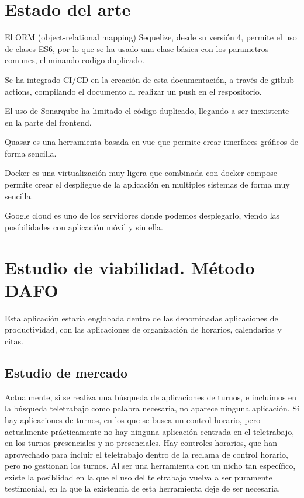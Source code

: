 \documentclass[11pt,spanish,listoffigures,listoftables]{tfgetsinf}
\begin{document}


\chapter{Estado del arte}

El ORM (object-relational mapping) Sequelize, desde su versión 4, permite el uso de clases ES6, por lo que se ha usado una clase básica con los parametros comunes, eliminando codigo duplicado.

Se ha integrado CI/CD en la creación de esta documentación, a través de github actions, compilando el documento al realizar un push en el respositorio.

El uso de Sonarqube ha limitado el código duplicado, llegando a ser inexistente en la parte del frontend.

Quasar es una herramienta basada en vue que permite crear itnerfaces gráficos de forma sencilla.

Docker es una virtualización muy ligera que combinada con docker-compose permite crear el despliegue de la aplicación en multiples sistemas de forma muy sencilla.

Google cloud es uno de los servidores donde podemos desplegarlo, viendo las posibilidades con aplicación móvil y sin ella.

\chapter{Estudio de viabilidad. Método DAFO}

Esta aplicación estaría englobada dentro de las denominadas aplicaciones de productividad, con las aplicaciones de organización de horarios, calendarios y citas.

\section{Estudio de mercado}

Actualmente, si se realiza una búsqueda de aplicaciones de turnos, e incluimos en la búsqueda teletrabajo como palabra necesaria, no aparece ninguna aplicación. 
Sí hay aplicaciones de turnos, en los que se busca un control horario, pero actualmente prácticamente no hay ninguna aplicación centrada en el teletrabajo, en los turnos presenciales y no presenciales.
Hay controles horarios, que han aprovechado para incluir el teletrabajo dentro de la reclama de control horario, pero no gestionan los turnos.
Al ser una herramienta con un nicho tan específico, existe la posiblidad en la que el uso del teletrabajo vuelva a ser puramente testimonial, en la que la existencia de esta herramienta deje de ser necesaria.
\end{document}
